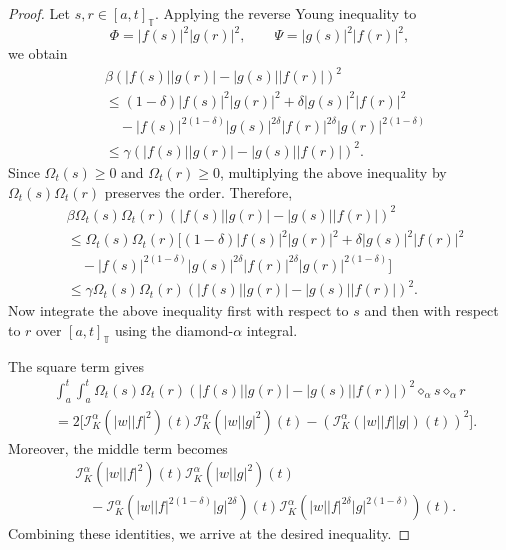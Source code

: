 \documentclass[11pt]{article}
\begin{document}
\begin{proof}
Let $s,r\in[a,t]_{\mathbb{T}}$. Applying the reverse Young inequality to
\[
    \Phi=|f(s)|^2|g(r)|^2,
    \qquad
    \Psi=|g(s)|^2|f(r)|^2,
\]
we obtain
\[
\begin{aligned}
&\beta\left(|f(s)||g(r)|-|g(s)||f(r)|\right)^2                                      \\
&\leq
(1-\delta)|f(s)|^2|g(r)|^2
+\delta |g(s)|^2|f(r)|^2                                                            \\
&\quad
-|f(s)|^{2(1-\delta)}|g(s)|^{2\delta}
 |f(r)|^{2\delta}|g(r)|^{2(1-\delta)}                                               \\
&\leq
\gamma\left(|f(s)||g(r)|-|g(s)||f(r)|\right)^2 .
\end{aligned}
\]
Since $\Omega_t(s)\geq0$ and $\Omega_t(r)\geq0$, multiplying the above
inequality by $\Omega_t(s)\Omega_t(r)$ preserves the order. Therefore,
\[
\begin{aligned}
&\beta\Omega_t(s)\Omega_t(r)
\left(|f(s)||g(r)|-|g(s)||f(r)|\right)^2                                      \\
&\leq
\Omega_t(s)\Omega_t(r)
\bigg[
(1-\delta)|f(s)|^2|g(r)|^2
+\delta |g(s)|^2|f(r)|^2                                                        \\
&\quad
-|f(s)|^{2(1-\delta)}|g(s)|^{2\delta}
 |f(r)|^{2\delta}|g(r)|^{2(1-\delta)}
\bigg]                                                                         \\
&\leq
\gamma\Omega_t(s)\Omega_t(r)
\left(|f(s)||g(r)|-|g(s)||f(r)|\right)^2 .
\end{aligned}
\]
Now integrate the above inequality first with respect to $s$ and then with
respect to $r$ over $[a,t]_{\mathbb{T}}$ using the diamond-$\alpha$ integral.

The square term gives
\[
\begin{aligned}
&\int_a^t\int_a^t
\Omega_t(s)\Omega_t(r)
\left(|f(s)||g(r)|-|g(s)||f(r)|\right)^2
\diamond_{\alpha}s\diamond_{\alpha}r                                      \\
&=
2\bigg[
\mathcal{I}_{K}^{\alpha}(|w||f|^2)(t)
\mathcal{I}_{K}^{\alpha}(|w||g|^2)(t)
-
\left(\mathcal{I}_{K}^{\alpha}(|w||f||g|)(t)\right)^2
\bigg].
\end{aligned}
\]
Moreover, the middle term becomes
\[
\begin{aligned}
&
\mathcal{I}_{K}^{\alpha}(|w||f|^2)(t)
\mathcal{I}_{K}^{\alpha}(|w||g|^2)(t)                                      \\
&\quad -
\mathcal{I}_{K}^{\alpha}
\left(|w||f|^{2(1-\delta)}|g|^{2\delta}\right)(t)
\mathcal{I}_{K}^{\alpha}
\left(|w||f|^{2\delta}|g|^{2(1-\delta)}\right)(t).
\end{aligned}
\]
Combining these identities, we arrive at the desired inequality.
\end{proof}
\end{document}
